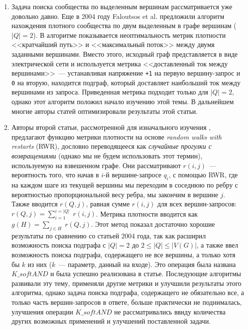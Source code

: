 \begin{enumerate}
  \item Задача поиска сообщества по выделенным вершинам рассматривается уже довольно давно. Еще в 2004 году Faloutsos et al. \cite{Faloutsos04} предложили алгоритм нахождения плотного сообщества по двум выделенным в графе вершинам ($|Q| = 2$). В алгоритме показывается неоптимальность метрик плотности <<кратчайший путь>> и <<максимальный поток>> между двумя заданными вершинами. Вместо этого, исходный граф представляется в виде электрической сети и используется метрика <<доставленный ток между вершинами>>~--- устанавливая напряжение \texttt{+1} на первую вершину-запрос и \texttt{0} на вторую, находится подграф, который доставляет наибольший ток между вершинами из запроса. Приведенная метрика подходит только для $|Q| = 2$, однако этот алгоритм положил начало изучению этой темы. В дальнейшем многие авторы статей оптимизировали результаты этой статьи. 

  \item Авторы второй статьи, рассмотренной для изначального изучения \cite{Faloutsos06}, предлагают функцию метрики плотности на основе \textit{random walks with restarts} (RWR), дословно переводящееся как \textit{случайные прогулки с возвращениями} (однако мы не будем использовать этот термин), используемую на взвешенном графе. Они рассматривают $r(i,j)$~--- вероятность того, что начав в $i$-й вершине-запросе $q_i$, с помощью RWR, где на каждом шаге из текущей вершины мы переходим в соседнюю по ребру с вероятностью пропорциональной весу ребра, мы закончим в вершине $j$. Также вводится $r(Q, j)$, равная сумме $r(i, j)$ для всех вершин-запросов: $r(Q, j) = \sum_{i = 1}^{i = |Q|}\; r(i, j)$. Метрика плотности вводится как $g(H) = \sum_{j \in H}\; r(Q, j)$. Этот метод показал достаточно хорошие результаты по сравнению со статьей 2004 года, так как расширил возможность поиска подграфа с $|Q| = 2$ до $2 \le |Q| \le |V(G)|$, а также ввел возможность поиска подграфа, содержащего не все вершины, а только хотя бы $k$ из них ($k$~--- параметр, данный на входе). Это операция была названа $K\_softAND$ и была успешно реализована в статье. Последующие алгоритмы развивали эту тему, применяли другие метрики и улучшили результаты этого алгоритма, однако задача поиска подграфа, содержащего не обязательно все, а только часть вершин-запросов в ответе, больше практически не поднималась, улучшения операции $K\_softAND$ не рассматривались ввиду количества других возможных применений и улучшений поставленной задачи. 


\end{enumerate}
